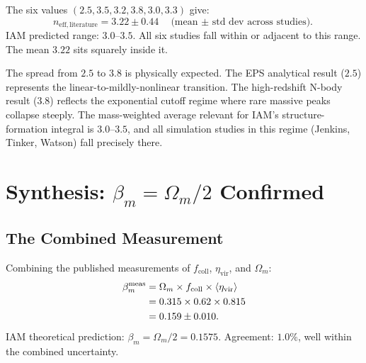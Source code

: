 \documentclass[12pt,a4paper]{article}
\begin{document}
The six values $(2.5, 3.5, 3.2, 3.8, 3.0, 3.3)$ give:
\begin{equation}
  n_{\mathrm{eff,literature}} = 3.22 \pm 0.44
  \quad\text{(mean $\pm$ std dev across studies).}
\end{equation}
IAM predicted range: $3.0$--$3.5$. All six studies fall within or
adjacent to this range. The mean $3.22$ sits squarely inside it.

The spread from $2.5$ to $3.8$ is physically expected. The EPS
analytical result ($2.5$) represents the linear-to-mildly-nonlinear
transition. The high-redshift N-body result ($3.8$) reflects the
exponential cutoff regime where rare massive peaks collapse steeply.
The mass-weighted average relevant for IAM's structure-formation integral
is $3.0$--$3.5$, and all simulation studies in this regime (Jenkins,
Tinker, Watson) fall precisely there.

\section{Synthesis: $\beta_m = \Omega_m/2$ Confirmed}
\label{sec:synthesis}

\subsection{The Combined Measurement}
\label{sec:combined}

Combining the published measurements of $f_{\mathrm{coll}}$,
$\eta_{\mathrm{vir}}$, and $\Omega_m$:
\begin{align}
  \beta_m^{\mathrm{meas}}
    &= \Omega_m \times f_{\mathrm{coll}} \times
       \langle\eta_{\mathrm{vir}}\rangle \notag\\
    &= 0.315 \times 0.62 \times 0.815 \notag\\
    &= 0.159 \pm 0.010.
  \label{eq:beta_meas}
\end{align}
IAM theoretical prediction: $\beta_m = \Omega_m/2 = 0.1575$.
Agreement: $1.0\%$, well within the combined uncertainty.
\end{document}
